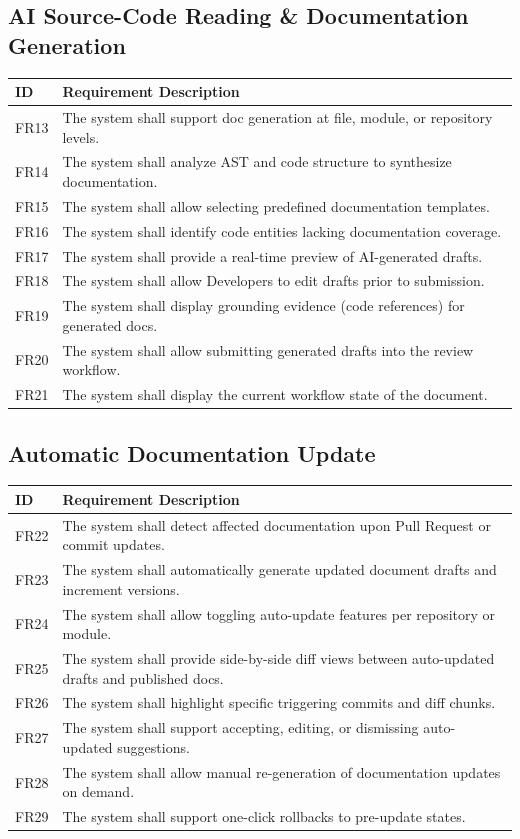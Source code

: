 \subsection{AI Source-Code Reading \& Documentation Generation}
\begin{longtable}{p{2cm} p{11.3cm}}
	\toprule
	\textbf{ID} & \textbf{Requirement Description} \\
	\midrule
	\endhead
	FR13 & The system shall support doc generation at file, module, or repository levels. \\
	FR14 & The system shall analyze AST and code structure to synthesize documentation. \\
	FR15 & The system shall allow selecting predefined documentation templates. \\
	FR16 & The system shall identify code entities lacking documentation coverage. \\
	FR17 & The system shall provide a real-time preview of AI-generated drafts. \\
	FR18 & The system shall allow Developers to edit drafts prior to submission. \\
	FR19 & The system shall display grounding evidence (code references) for generated docs. \\
	FR20 & The system shall allow submitting generated drafts into the review workflow. \\
	FR21 & The system shall display the current workflow state of the document. \\
	\bottomrule
\end{longtable}

\subsection{Automatic Documentation Update}
\begin{longtable}{p{2cm} p{11.3cm}}
	\toprule
	\textbf{ID} & \textbf{Requirement Description} \\
	\midrule
	\endhead
	FR22 & The system shall detect affected documentation upon Pull Request or commit updates. \\
	FR23 & The system shall automatically generate updated document drafts and increment versions. \\
	FR24 & The system shall allow toggling auto-update features per repository or module. \\
	FR25 & The system shall provide side-by-side diff views between auto-updated drafts and published docs. \\
	FR26 & The system shall highlight specific triggering commits and diff chunks. \\
	FR27 & The system shall support accepting, editing, or dismissing auto-updated suggestions. \\
	FR28 & The system shall allow manual re-generation of documentation updates on demand. \\
	FR29 & The system shall support one-click rollbacks to pre-update states. \\
	\bottomrule
\end{longtable}

